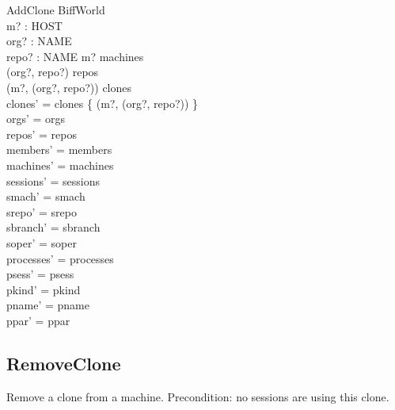 \documentclass[a4paper,10pt,fleqn]{article}
\begin{document}
\begin{schema}{AddClone}
  \Delta BiffWorld \\
  m? : HOST \\
  org? : NAME \\
  repo? : NAME
  \where
  m? \in machines \\
  (org?, repo?) \in repos \\
  (m?, (org?, repo?)) \notin clones \\
  clones' = clones \cup \{ (m?, (org?, repo?)) \} \\
  orgs' = orgs \\
  repos' = repos \\
  members' = members \\
  machines' = machines \\
  sessions' = sessions \\
  smach' = smach \\
  srepo' = srepo \\
  sbranch' = sbranch \\
  soper' = soper \\
  processes' = processes \\
  psess' = psess \\
  pkind' = pkind \\
  pname' = pname \\
  ppar' = ppar
\end{schema}

\subsection{RemoveClone}

Remove a clone from a machine.  Precondition: no sessions are using
this clone.
\end{document}
